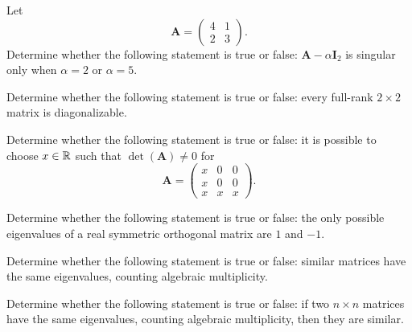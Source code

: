 \begin{problem}
Let
\[
\mathbf A=
\begin{pmatrix}
4&1\\
2&3
\end{pmatrix}.
\]
Determine whether the following statement is true or false: $\mathbf A-\alpha\mathbf I_2$ is singular only when $\alpha=2$ or $\alpha=5$.
\end{problem}

\begin{problem}
Determine whether the following statement is true or false: every full-rank $2\times2$ matrix is diagonalizable.
\end{problem}

\begin{problem}
Determine whether the following statement is true or false: it is possible to choose $x\in\mathbb{R}$ such that $\det(\mathbf A)\ne0$ for
\[
\mathbf A=
\begin{pmatrix}
x&0&0\\
x&0&0\\
x&x&x
\end{pmatrix}.
\]
\end{problem}

\begin{problem}
Determine whether the following statement is true or false: the only possible eigenvalues of a real symmetric orthogonal matrix are $1$ and $-1$.
\end{problem}

\begin{problem}
Determine whether the following statement is true or false: similar matrices have the same eigenvalues, counting algebraic multiplicity.
\end{problem}

\begin{problem}
Determine whether the following statement is true or false: if two $n\times n$ matrices have the same eigenvalues, counting algebraic multiplicity, then they are similar.
\end{problem}

